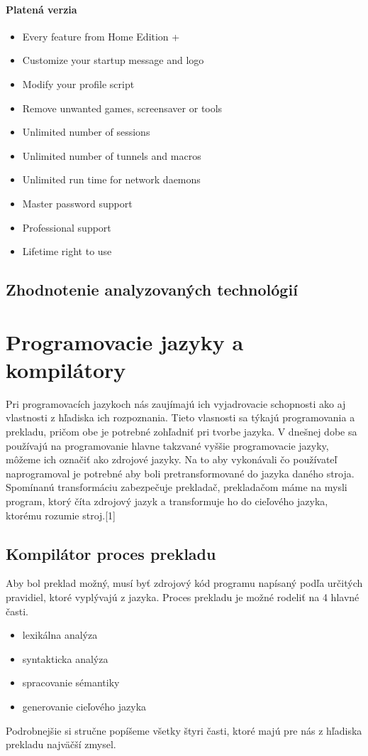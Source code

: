 \paragraph{Platená verzia}

\begin{itemize}
	\item Every feature from Home Edition +
	\item Customize your startup message and logo
	\item Modify your profile script
	\item Remove unwanted games, screensaver or tools
	\item Unlimited number of sessions
	\item Unlimited number of tunnels and macros
	\item Unlimited run time for network daemons
	\item Master password support
	\item Professional support
	\item Lifetime right to use
\end{itemize}

\subsection{Zhodnotenie analyzovaných technológií}

\section{Programovacie jazyky a kompilátory}
\indent Pri programovacích jazykoch nás zaujímajú ich vyjadrovacie schopnosti ako aj vlastnosti z hľadiska ich rozpoznania. Tieto vlasnosti sa týkajú programovania a prekladu, pričom obe je potrebné zohľadniť pri tvorbe jazyka. V dnešnej dobe sa používajú na programovanie hlavne takzvané vyššie programovacie jazyky, môžeme ich označiť ako zdrojové jazyky. Na to aby vykonávali čo používateľ naprogramoval je potrebné aby boli pretransformované do jazyka daného stroja. Spomínanú transformáciu zabezpečuje prekladač, prekladačom máme na mysli program, ktorý číta zdrojový jazyk a transformuje ho do cieľového jazyka, ktorému rozumie stroj.[1]

\subsection{Kompilátor proces prekladu}
Aby bol preklad možný, musí byť zdrojový kód programu napísaný podľa určitých pravidiel, ktoré vyplývajú z jazyka. Proces prekladu je možné rodeliť na 4 hlavné časti.
\begin{itemize}
	\item lexikálna analýza
	\item syntakticka analýza
	\item spracovanie sémantiky
	\item generovanie cieľového jazyka
\end{itemize}
\indent Podrobnejšie si stručne popíšeme všetky štyri časti, ktoré majú pre nás z hľadiska prekladu najväčší zmysel.
\newline
